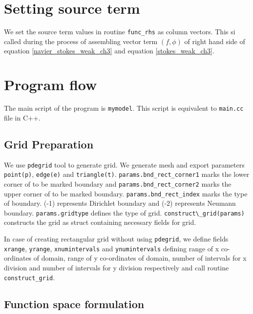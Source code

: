 \documentclass[a4paper]{book}
\begin{document}
\section{Setting source term}

We set the source term values in routine \verb|func_rhs| as column vectors. This si called during the process of assembling vector term $(f,\phi)$ of right hand side of equation \ref{navier_stokes_weak_ch3} and equation \ref{stokes_weak_ch3}.

\section{Program flow}

The main script of the program is \verb|mymodel|. This script is equivalent to \verb|main.cc| file in C++.

\subsection{Grid Preparation}

We use \verb|pdegrid| tool to generate grid. We generate mesh and export parameters \verb|point(p)|, \verb|edge(e)| and \verb|triangle(t)|. \verb|params.bnd_rect_corner1| marks the lower corner of to be marked boundary and \verb|params.bnd_rect_corner2| marks the upper corner of to be marked boundary. \verb|params.bnd_rect_index| marks the type of boundary. (-1) represents Dirichlet boundary and (-2) represents Neumann boundary. \verb|params.gridtype| defines the type of grid. \verb|construct\_grid(params)| constructs the grid as struct containing necessary fields for grid. 

In case of creating rectangular grid without using \verb|pdegrid|, we define fields \verb|xrange|, \verb|yrange|, \verb|xnumintervals| and \verb|ynumintervals| defining range of x co-ordinates of domain, range of y co-ordinates of domain, number of intervals for x division and number of intervals for y division respectively and call routine \verb|construct_grid|.

\subsection{Function space formulation}
\end{document}
